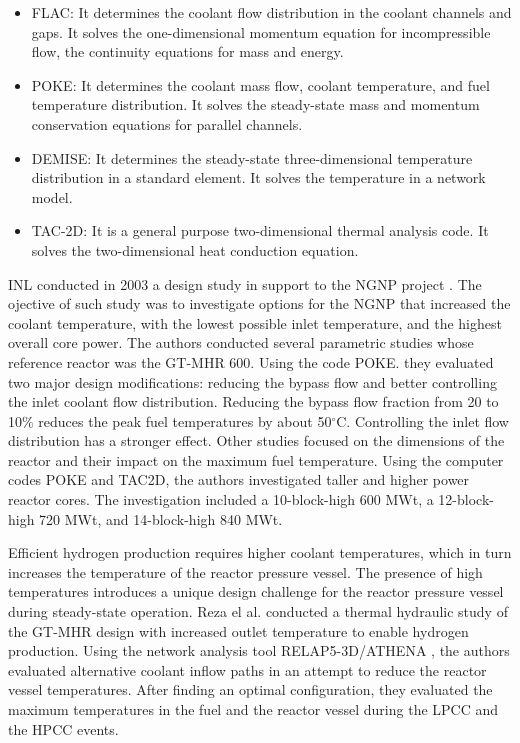 \documentclass[11pt,letterpaper]{article}
\begin{document}
\begin{itemize}
\item FLAC: It determines the coolant flow distribution in the coolant channels and gaps.
It solves the one-dimensional momentum equation for incompressible flow, the continuity equations for mass and energy.

\item POKE: It determines the coolant mass flow, coolant temperature, and fuel temperature distribution.
It solves the steady-state mass and momentum conservation equations for parallel channels.

\item DEMISE: It determines the steady-state three-dimensional temperature distribution in a standard element.
It solves the temperature in a network model.

\item TAC-2D: It is a general purpose two-dimensional thermal analysis code.
It solves the two-dimensional heat conduction equation.
\end{itemize}



\gls{INL} conducted in 2003 a design study in support to the \gls{NGNP} project \cite{macdonald_ngnp_2003}.
The ojective of such study was to investigate options for the NGNP that increased the coolant temperature, with the lowest possible inlet temperature, and the highest overall core power.
The authors conducted several parametric studies whose reference reactor was the GT-MHR 600.
Using the code POKE. they evaluated two major design modifications: reducing the bypass flow and better controlling the inlet coolant flow distribution.
Reducing the bypass flow fraction from 20 to 10$\%$ reduces the peak fuel temperatures by about 50$^{\circ}$C.
Controlling the inlet flow distribution has a stronger effect.
Other studies focused on the dimensions of the reactor and their impact on the maximum fuel temperature.
Using the computer codes POKE and TAC2D, the authors investigated taller and higher power reactor cores.
The investigation included a 10-block-high 600 MWt, a 12-block-high 720 MWt, and 14-block-high 840 MWt.




Efficient hydrogen production requires higher coolant temperatures, which in turn increases the temperature of the reactor pressure vessel.
The presence of high temperatures introduces a unique design challenge for the reactor pressure vessel during steady-state operation.
Reza el al. \cite{reza_design_2006} conducted a thermal hydraulic study of the GT-MHR design \cite{general_atomics_gas_1996} with increased outlet temperature to enable hydrogen production.
Using the network analysis tool RELAP5-3D/ATHENA \cite{inl_relap5-3dathena_2005}, the authors evaluated alternative coolant inflow paths in an attempt to reduce the reactor vessel temperatures.
After finding an optimal configuration, they evaluated the maximum temperatures in the fuel and the reactor vessel during the \gls{LPCC} and the \gls{HPCC} events.
\end{document}

